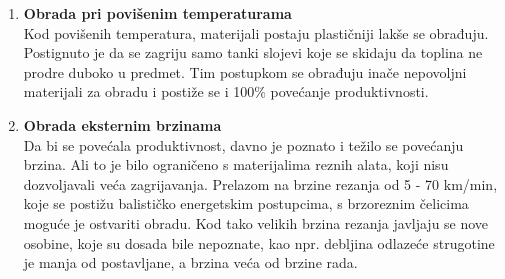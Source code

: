 \documentclass[a4paper,12pt]{article}
\numberwithin{figure}{section}
\begin{document}
\begin{enumerate}
\begin{figure}[!h]
\end{figure}
\FloatBarrier
\item \textbf{Obrada pri povišenim temperaturama}\\
Kod povišenih temperatura, materijali postaju plastičniji lakše se obrađuju. Postignuto je da se zagriju samo tanki slojevi koje se skidaju da toplina ne prodre duboko u predmet. Tim postupkom se obrađuju inače nepovoljni materijali za obradu i postiže se i 100$\%$ povećanje produktivnosti.
\item \textbf{Obrada eksternim brzinama}\\
Da bi se povećala produktivnost, davno je poznato i težilo se povećanju brzina. Ali to je bilo ograničeno s materijalima reznih alata, koji nisu dozvoljavali veća zagrijavanja. Prelazom na brzine rezanja od 5 - 70 km/min, koje se postižu balističko energetskim postupcima, s brzoreznim čelicima moguće je ostvariti obradu. Kod tako velikih brzina rezanja javljaju se nove osobine, koje su dosada bile nepoznate, kao npr. debljina odlazeće strugotine je manja od postavljane, a brzina veća od brzine rada.
\end{enumerate}
\end{document}
